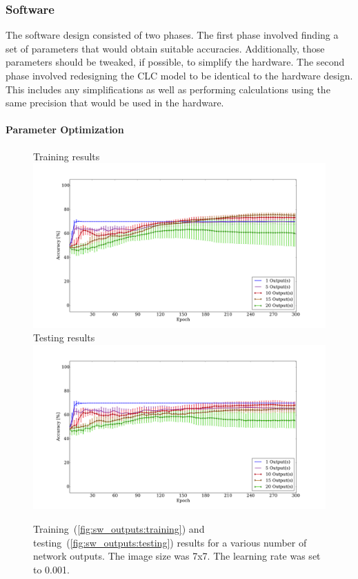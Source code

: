 \documentclass[10pt,journal]{IEEEtran}
\newcommand{\subfig}[1]{~(\ref{#1})}
\begin{document}
		
		\subsubsection{Software}
			The software design consisted of two phases. The first phase involved finding a set of parameters that would obtain suitable accuracies. Additionally, those parameters should be tweaked, if possible, to simplify the hardware. The second phase involved redesigning the CLC model to be identical to the hardware design. This includes any simplifications as well as performing calculations using the same precision that would be used in the hardware.
			
			\paragraph{Parameter Optimization}
				\begin{figure}[t!]
					\captionsetup[subfigure]{position=b}
					\centering
					\hfill
					\subcaptionbox
					{
						Training results
						\label{fig:sw_outputs:training}
					}
					{\includegraphics[width=0.49\linewidth]{sw_outputs_training}}
					\hfill
					\subcaptionbox
					{
						Testing results
						\label{fig:sw_outputs:testing}
					}
					{\includegraphics[width=0.49\linewidth]{sw_outputs_testing}}
					\hfill
					\caption{Training\subfig{fig:sw_outputs:training} and testing\subfig{fig:sw_outputs:testing} results for a various number of network outputs. The image size was 7x7. The learning rate was set to 0.001.}
					\label{fig:sw_outputs}
				\end{figure}
				
\end{document}
